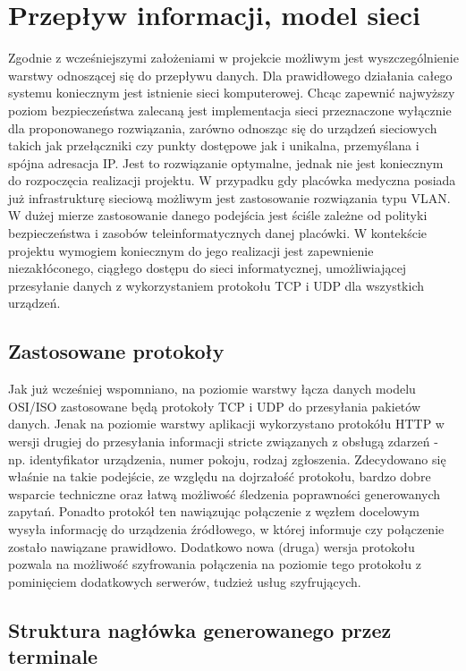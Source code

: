 \documentclass[12pt]{article} %
\begin{document}
\section{Przepływ informacji, model sieci}

Zgodnie z wcześniejszymi założeniami w projekcie możliwym jest wyszczególnienie warstwy odnoszącej się do przepływu danych. Dla prawidłowego działania całego systemu koniecznym jest istnienie sieci komputerowej. Chcąc zapewnić najwyższy poziom bezpieczeństwa zalecaną jest implementacja sieci przeznaczone wyłącznie dla proponowanego rozwiązania, zarówno odnosząc się do urządzeń sieciowych takich jak przełączniki czy punkty dostępowe jak i unikalna, przemyślana  i spójna adresacja IP. Jest to rozwiązanie optymalne, jednak nie jest koniecznym do rozpoczęcia realizacji projektu. W przypadku gdy placówka medyczna posiada już infrastrukturę sieciową możliwym jest zastosowanie rozwiązania typu VLAN. W dużej mierze zastosowanie danego podejścia jest ściśle zależne od polityki bezpieczeństwa i zasobów teleinformatycznych danej placówki. W kontekście projektu wymogiem koniecznym do jego realizacji jest zapewnienie niezakłóconego, ciągłego dostępu do sieci informatycznej,  umożliwiającej przesyłanie danych z wykorzystaniem protokołu TCP i UDP dla wszystkich urządzeń.

\subsection{Zastosowane protokoły}

Jak już wcześniej wspomniano, na poziomie warstwy łącza danych modelu OSI/ISO zastosowane będą protokoły TCP i UDP do przesyłania pakietów danych. Jenak na poziomie warstwy aplikacji wykorzystano protokółu HTTP w wersji drugiej do przesyłania informacji stricte związanych z obsługą zdarzeń - np.  identyfikator urządzenia, numer pokoju, rodzaj zgłoszenia. Zdecydowano się właśnie na takie podejście, ze względu na dojrzałość protokołu, bardzo dobre wsparcie techniczne oraz łatwą możliwość śledzenia poprawności generowanych zapytań. Ponadto protokół ten nawiązując połączenie z węzłem docelowym wysyła informację do urządzenia źródłowego, w której informuje czy połączenie zostało nawiązane prawidłowo. Dodatkowo nowa (druga) wersja protokołu pozwala na możliwość szyfrowania połączenia na poziomie tego protokołu z pominięciem dodatkowych serwerów, tudzież usług szyfrujących.

\subsection{Struktura nagłówka generowanego przez terminale}
\end{document}
